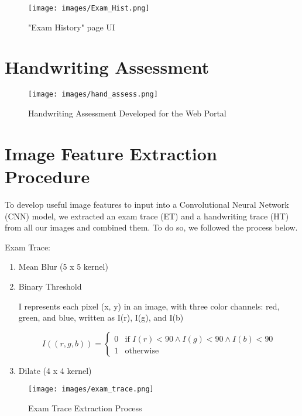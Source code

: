 \documentclass[pmlr,twocolumn,10pt,breaklinks, x11names,table]{jmlr} %
\begin{document}
\begin{figure} [h]
\label{fig:fig7}
\centering 
\texttt{[image: images/Exam\_Hist.png]}
\caption{"Exam History" page UI}
\end{figure}

\clearpage

\section{Handwriting Assessment}
\label{app:assessment}

\begin{figure} [h]
\label{fig:fig5}
\centering 
\texttt{[image: images/hand\_assess.png]}
\caption{Handwriting Assessment Developed for the Web Portal}
\end{figure}

\clearpage

\section{Image Feature Extraction Procedure}
\label{app:imgextraction}

To develop useful image features to input into a Convolutional Neural Network (CNN) model, we extracted an exam trace (ET) and a handwriting trace (HT) from all our images and combined them. To do so, we followed the process below.

Exam Trace:

\begin{enumerate}
\item Mean Blur (5 x 5 kernel)
\item Binary Threshold

I represents each pixel (x, y) in an image, with three color channels: red, green, and blue, written as I(r), I(g), and I(b)

\[I((r, g, b)) = \begin{cases} 
    0 & \text{if } I(r) < 90 \land I(g) < 90 \land I(b) < 90 \\
    1 & \text{otherwise}
\end{cases}\]

\item Dilate (4 x 4 kernel)
\end{enumerate}

\begin{figure}[h] 
\label{fig: fig2}
\centering 
\texttt{[image: images/exam\_trace.png]}
\caption{Exam Trace Extraction Process}
\end{figure}
\end{document}

